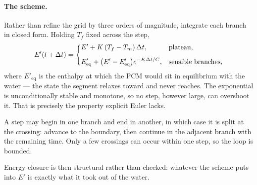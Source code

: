 \documentclass[11pt,a4paper]{article}
\newcommand{\Tm}{\ensuremath{T_{m}}}
\newcommand{\Eeq}{\ensuremath{E'_{\mathrm{eq}}}}
\begin{document}
\paragraph{The scheme.}
Rather than refine the grid by three orders of magnitude, integrate each branch
in closed form. Holding $T_f$ fixed across the step,
\begin{equation}
  E'(t+\Delta t) =
  \begin{dcases}
    E' + K\left(T_f-\Tm\right)\Delta t, & \text{plateau},\\[4pt]
    \Eeq + \bigl(E'-\Eeq\bigr)e^{-K\Delta t/C}, & \text{sensible branches},
  \end{dcases}
  \label{eq:exact}
\end{equation}
where $\Eeq$ is the enthalpy at which the PCM would sit in equilibrium with the
water --- the state the segment relaxes toward and never reaches. The
exponential is unconditionally stable and monotone, so no step, however large,
can overshoot it. That is precisely the property explicit Euler lacks.

A step may begin in one branch and end in another, in which case it is split at
the crossing: advance to the boundary, then continue in the adjacent branch with
the remaining time. Only a few crossings can occur within one step, so the loop
is bounded.

\begin{center}
\end{center}

Energy closure is then structural rather than checked: whatever the scheme puts
into $E'$ is exactly what it took out of the water.
\end{document}
